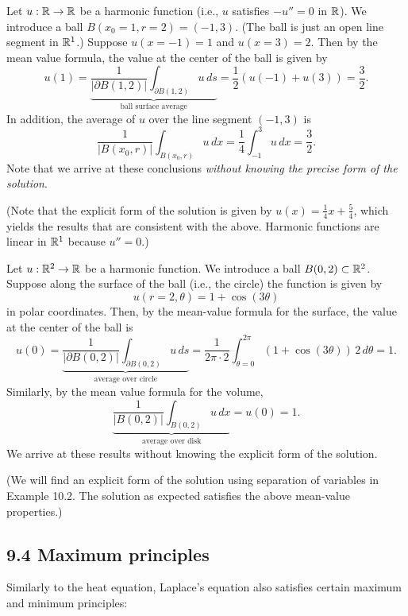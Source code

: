 \begin{example}
    Let $u : \mathbb{R} \to \mathbb{R}$ be a harmonic function (i.e., $u$ satisfies $-u'' = 0$ in $\mathbb{R}$). We introduce a ball $B(x_0 = 1, r = 2) = (-1, 3)$. (The ball is just an open line segment in $\mathbb{R}^1$.) Suppose $u(x = -1) = 1$ and $u(x = 3) = 2$. Then by the mean value formula, the value at the center of the ball is given by
    \[u(1) = \underbrace{\frac{1}{|\partial B(1, 2)|} \int_{\partial B(1, 2)} u\,ds}_{\text{ball surface average}} = \frac{1}{2}(u(-1) + u(3)) = \frac{3}{2}.\]
    In addition, the average of $u$ over the line segment $(-1, 3)$ is
    \[\frac{1}{|B(x_0, r)|} \int_{B(x_0, r)} u\,dx = \frac{1}{4} \int_{-1}^{3} u\,dx = \frac{3}{2}.\]
    Note that we arrive at these conclusions \textit{without knowing the precise form of the solution}.

    (Note that the explicit form of the solution is given by $u(x) = \frac{1}{4}x + \frac{5}{4}$, which yields the results that are consistent with the above. Harmonic functions are linear in $\mathbb{R}^1$ because $u'' = 0$.)
\end{example}

\begin{example}
    Let $u : \mathbb{R}^2 \to \mathbb{R}$ be a harmonic function. We introduce a ball $B(0, 2) \subset \mathbb{R}^2$. Suppose along the surface of the ball (i.e., the circle) the function is given by
    \[u(r = 2, \theta) = 1 + \cos(3\theta)\]
    in polar coordinates. Then, by the mean-value formula for the surface, the value at the center of the ball is
    \[u(0) = \underbrace{\frac{1}{|\partial B(0, 2)|} \int_{\partial B(0, 2)} u\,ds}_{\text{average over circle}} = \frac{1}{2\pi \cdot 2} \int_{\theta=0}^{2\pi} (1 + \cos(3\theta))\,2\,d\theta = 1.\]
    Similarly, by the mean value formula for the volume,
    \[\underbrace{\frac{1}{|B(0, 2)|} \int_{B(0, 2)} u\,dx}_{\text{average over disk}} = u(0) = 1.\]
    We arrive at these results without knowing the explicit form of the solution.

    (We will find an explicit form of the solution using separation of variables in Example 10.2. The solution as expected satisfies the above mean-value properties.)
\end{example}

\subsection{9.4 Maximum principles}
Similarly to the heat equation, Laplace's equation also satisfies certain maximum and minimum principles:

